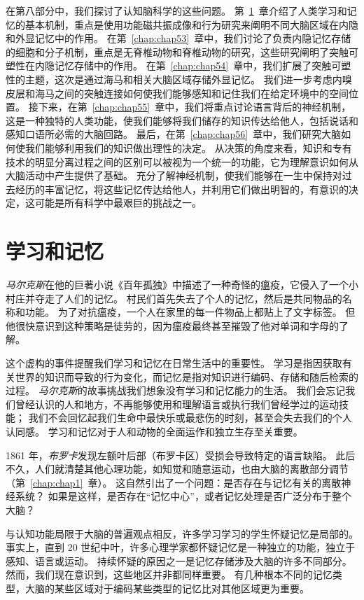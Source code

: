 在第八部分中，我们探讨了认知脑科学的这些问题。
第~\ref{chap:chap52}~章介绍了人类学习和记忆的基本机制，重点是使用功能磁共振成像和行为研究来阐明不同大脑区域在内隐和外显记忆中的作用。
在第~\ref{chap:chap53}~章中，我们讨论了负责内隐记忆存储的细胞和分子机制，重点是无脊椎动物和脊椎动物的研究，这些研究阐明了突触可塑性在内隐记忆存储中的作用。
在第~\ref{chap:chap54}~章中，我们扩展了突触可塑性的主题，这次是通过海马和相关大脑区域存储外显记忆。
我们进一步考虑内嗅皮层和海马之间的突触连接如何使我们能够感知和记住我们在给定环境中的空间位置。
接下来，在第~\ref{chap:chap55}~章中，我们将重点讨论语言背后的神经机制，这是一种独特的人类功能，使我们能够将我们储存的知识传达给他人，包括说话和感知口语所必需的大脑回路。
最后，在第~\ref{chap:chap56}~章中，我们研究大脑如何使我们能够利用我们的知识做出理性的决定。
从决策的角度来看，知识和专有技术的明显分离过程之间的区别可以被视为一个统一的功能，它为理解意识如何从大脑活动中产生提供了基础。
充分了解神经机制，使我们能够在一生中保持对过去经历的丰富记忆，将这些记忆传达给他人，并利用它们做出明智的，有意识的决定，这可能是所有科学中最艰巨的挑战之一。



\chapter{学习和记忆} \label{chap:chap52}

\textit{马尔克斯}在他的巨著小说《百年孤独》中描述了一种奇怪的瘟疫，它侵入了一个小村庄并夺走了人们的记忆。
村民们首先失去了个人的记忆，然后是共同物品的名称和功能。
为了对抗瘟疫，一个人在家里的每一件物品上都贴上了文字标签。
但他很快意识到这种策略是徒劳的，因为瘟疫最终甚至摧毁了他对单词和字母的了解。


这个虚构的事件提醒我们学习和记忆在日常生活中的重要性。
学习是指因获取有关世界的知识而导致的行为变化，而记忆是指对知识进行编码、存储和随后检索的过程。
\textit{马尔克斯}的故事挑战我们想象没有学习和记忆能力的生活。
我们会忘记我们曾经认识的人和地方，不再能够使用和理解语言或执行我们曾经学过的运动技能；
我们不会回忆起我们生命中最快乐或最悲伤的时刻，甚至会失去我们的个人认同感。
学习和记忆对于人和动物的全面运作和独立生存至关重要。


1861 年，\textit{布罗卡}发现左额叶后部（布罗卡区）受损会导致特定的语言缺陷。
此后不久，人们就清楚其他心理功能，如知觉和随意运动，也由大脑的离散部分调节（第~\ref{chap:chap1}~章）。
这自然引出了一个问题：是否存在与记忆有关的离散神经系统？
如果是这样，是否存在“记忆中心”，或者记忆处理是否广泛分布于整个大脑？


与认知功能局限于大脑的普遍观点相反，许多学习学习的学生怀疑记忆是局部的。
事实上，直到 20 世纪中叶，许多心理学家都怀疑记忆是一种独立的功能，独立于感知、语言或运动。
持续怀疑的原因之一是记忆存储涉及大脑的许多不同部分。
然而，我们现在意识到，这些地区并非都同样重要。
有几种根本不同的记忆类型，大脑的某些区域对于编码某些类型的记忆比对其他区域更为重要。


